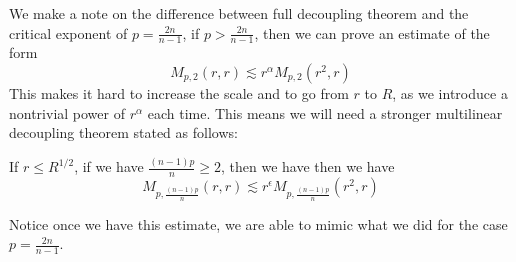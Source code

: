 We make a note on the difference between full decoupling theorem and the critical exponent of $p=\frac{2n}{n-1}$, if $p>\frac{2n}{n-1}$, then we can prove an estimate of the form
\begin{equation*}
    M_{p,2}(r,r)\lesssim r^\alpha M_{p,2}(r^2,r)
\end{equation*}
This makes it hard to increase the scale and to go from $r$ to $R$, as we introduce a nontrivial power of $r^\alpha$ each time. This means we will need a stronger multilinear decoupling theorem stated as follows:
\begin{theorem}[MK2]
    If $r\leq R^{1/2}$, if we have $\frac{(n-1)p}{n}\geq 2$, then we have
    then we have
    \begin{equation*}
        M_{p,\frac{(n-1)p}{n}}(r,r)\lesssim r^\epsilon M_{p,\frac{(n-1)p}{n}}(r^2,r)
    \end{equation*}
\end{theorem}
\begin{remark}
    Notice once we have this estimate, we are able to mimic what we did for the case $p=\frac{2n}{n-1}$.
\end{remark}
